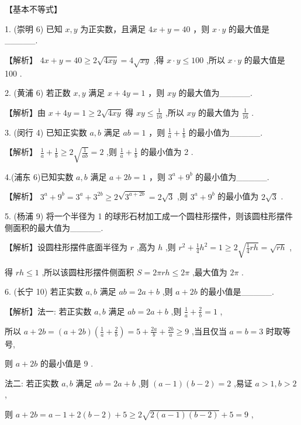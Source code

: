 \documentclass[10pt]{article}
\begin{document}
【基本不等式】

1. (崇明 6) 已知 \(x,y\) 为正实数，且满足 \({4x} + y = {40}\) ，则 \(x \cdot  y\) 的最大值是\_\_\_\_\_.

【解析】 \({4x} + y = {40} \geq  2\sqrt{4xy} = 4\sqrt{xy}\) ,得 \(x \cdot  y \leq  {100}\) ,所以 \(x \cdot  y\) 的最大值是 100 .

2. (黄浦 6) 若正数 \(x,y\) 满足 \(x + {4y} = 1\) ，则 \({xy}\) 的最大值为\_\_\_\_\_.

【解析】由 \(x + {4y} = 1 \geq  2\sqrt{4xy}\) 得 \({xy} \leq  \frac{1}{16}\) ,所以 \({xy}\) 的最大值为 \(\frac{1}{16}\) .

3. (闵行 4) 已知正实数 \(a,b\) 满足 \({ab} = 1\) ，则 \(\frac{1}{a} + \frac{1}{b}\) 的最小值为\_\_\_\_\_.

【解析】 \(\frac{1}{a} + \frac{1}{b} \geq  2\sqrt{\frac{1}{ab}} = 2\) ,则 \(\frac{1}{a} + \frac{1}{b}\) 的最小值为 2 .

4.(浦东 6)已知实数 \(a,b\) 满足 \(a + {2b} = 1\) ，则 \({3}^{a} + {9}^{b}\) 的最小值为\_\_\_\_\_.

【解析】 \({3}^{a} + {9}^{b} = {3}^{a} + {3}^{2b} \geq  2\sqrt{{3}^{a + {2b}}} = 2\sqrt{3}\) ,则 \({3}^{a} + {9}^{b}\) 的最小值为 \(2\sqrt{3}\) .

5. (杨浦 9) 将一个半径为 1 的球形石材加工成一个圆柱形摆件，则该圆柱形摆件侧面积的最大值为\_\_\_\_\_.

【解析】设圆柱形摆件底面半径为 \(r\) ,高为 \(h\) ,则 \({r}^{2} + \frac{1}{4}{h}^{2} = 1 \geq  2\sqrt{\frac{1}{4}{rh}} = \sqrt{rh}\) ,

得 \({rh} \leq  1\) ,所以该圆柱形摆件侧面积 \(S = {2\pi rh} \leq  {2\pi }\) ,最大值为 \({2\pi }\) .

6. (长宁 10) 若正实数 \(a,b\) 满足 \({ab} = {2a} + b\) ,则 \(a + {2b}\) 的最小值是\_\_\_\_\_.

【解析】法一: 若正实数 \(a,b\) 满足 \({ab} = {2a} + b\) ,则 \(\frac{1}{a} + \frac{2}{b} = 1\) ,

所以 \(a + {2b} = \left( {a + {2b}}\right) \left( {\frac{1}{a} + \frac{2}{b}}\right)  = 5 + \frac{2a}{b} + \frac{2b}{a} \geq  9\) ,当且仅当 \(a = b = 3\) 时取等号,

则 \(a + {2b}\) 的最小值是 9 .

法二: 若正实数 \(a,b\) 满足 \({ab} = {2a} + b\) ,则 \(\left( {a - 1}\right) \left( {b - 2}\right)  = 2\) ,易证 \(a > 1,b > 2\) ,

则 \(a + {2b} = a - 1 + 2\left( {b - 2}\right)  + 5 \geq  2\sqrt{2\left( {a - 1}\right) \left( {b - 2}\right) } + 5 = 9\) ,
\end{document}
